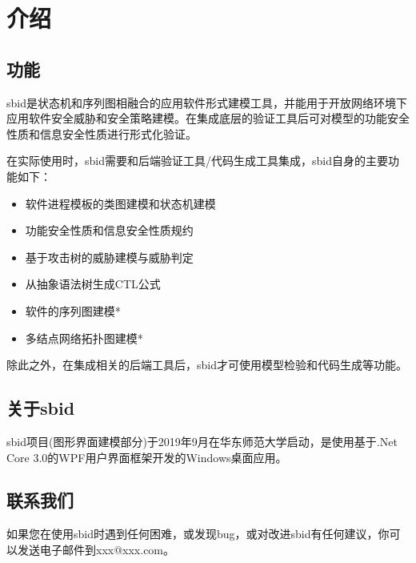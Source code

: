 \chapter{介绍}

\section{功能}
sbid是状态机和序列图相融合的应用软件形式建模工具，并能用于开放网络环境下应用软件安全威胁和安全策略建模。在集成底层的验证工具后可对模型的功能安全性质和信息安全性质进行形式化验证。
\par
在实际使用时，sbid需要和后端验证工具/代码生成工具集成，sbid自身的主要功能如下：
    \begin{itemize}
	\item{软件进程模板的类图建模和状态机建模}
	\item{功能安全性质和信息安全性质规约}
	\item{基于攻击树的威胁建模与威胁判定}
	\item{从抽象语法树生成CTL公式}
	\item{软件的序列图建模*}
	\item{多结点网络拓扑图建模*}
	\end{itemize}
\par
除此之外，在集成相关的后端工具后，sbid才可使用模型检验和代码生成等功能。

\section{关于sbid}
sbid项目(图形界面建模部分)于2019年9月在华东师范大学启动，是使用基于.Net Core 3.0的WPF用户界面框架开发的Windows桌面应用。

\section{联系我们}
如果您在使用sbid时遇到任何困难，或发现bug，或对改进sbid有任何建议，你可以发送电子邮件到xxx@xxx.com。
